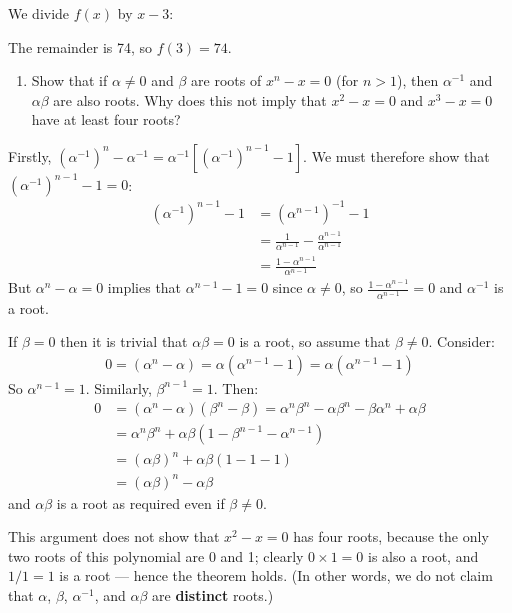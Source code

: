 \documentclass[a4paper,10pt]{article}
\newcommand{\answer}{\bfseries\color{Emerald}\refstepcounter{enumi}\item[\theenumi.]}
\begin{document}
We divide $ f(x) $ by $ x - 3 $:


The remainder is 74, so $ f(3) = 74 $.

\filbreak\begin{enumerate}[resume]
  \answer Show that if $ \alpha \neq 0 $ and $ \beta $ are roots of $ x^n - x = 0 $ (for $ n > 1 $), then $ \alpha^{-1} $ and $ \alpha\beta $
        are also roots. Why does this not imply that $ x^2 - x = 0 $ and $ x^3 - x = 0 $ have at least four roots?
\end{enumerate}

Firstly, $ (\alpha^{-1})^n - \alpha^{-1} = \alpha^{-1} \left[(\alpha^{-1})^{n - 1} - 1\right] $. We must therefore
show that $ (\alpha^{-1})^{n - 1} - 1 = 0 $:
\begin{align*}
  (\alpha^{-1})^{n - 1} - 1 &= (\alpha^{n - 1})^{-1} - 1\\
                            &= \frac{1}{\alpha^{n - 1}} - \frac{\alpha^{n-1}}{\alpha^{n-1}}\\
                            &= \frac{1 - \alpha^{n - 1}}{\alpha^{n - 1}}
\end{align*}
But $ \alpha^n - \alpha = 0 $ implies that $ \alpha^{n - 1} - 1 = 0 $ since $ \alpha \neq 0 $, so $ \frac{1 - \alpha^{n - 1}}{\alpha^{n - 1}} = 0 $
and $ \alpha^{-1} $ is a root.

If $ \beta = 0 $ then it is trivial that $ \alpha\beta = 0 $ is a root, so assume that $ \beta \neq 0 $. Consider:
\begin{align*}
  0 = (\alpha^n - \alpha) = \alpha(\alpha^{n - 1} - 1) = \alpha(\alpha^{n - 1} - 1)
\end{align*}
So $ \alpha^{n - 1} = 1 $. Similarly, $ \beta^{n - 1} = 1 $.
Then:
\begin{align*}
  0 &= (\alpha^n - \alpha)(\beta^n - \beta) = \alpha^n \beta^n - \alpha \beta^n - \beta \alpha^n + \alpha \beta\\
    &= \alpha^n \beta^n + \alpha\beta(1 - \beta^{n - 1} - \alpha^{n - 1})\\
    &= (\alpha\beta)^n + \alpha\beta(1 - 1 - 1)\\
    &= (\alpha\beta)^n - \alpha\beta
\end{align*}
and $ \alpha\beta $ is a root as required even if $ \beta \neq 0 $.

This argument does not show that $ x^2 - x = 0 $ has four roots, because the only two roots of
this polynomial are 0 and 1; clearly $ 0 \times 1 = 0 $ is also a root, and $ 1/1 = 1 $ is a root ---
hence the theorem holds. (In other words, we do not claim that $ \alpha $, $ \beta $, $ \alpha^{-1} $,
and $ \alpha\beta $ are \textbf{distinct} roots.)
\end{document}
